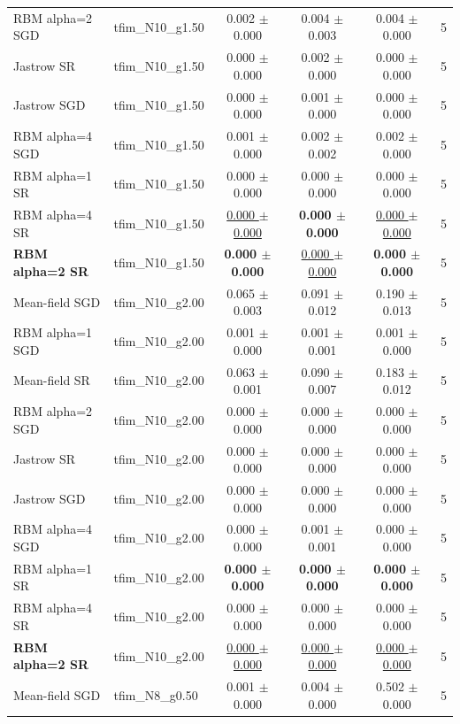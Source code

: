 \begin{tabular}{llcccc}
RBM alpha=2 SGD & tfim\_N10\_g1.50 & 0.002 $\pm$ 0.000 & 0.004 $\pm$ 0.003 & 0.004 $\pm$ 0.000 & 5 \\
Jastrow SR & tfim\_N10\_g1.50 & 0.000 $\pm$ 0.000 & 0.002 $\pm$ 0.000 & 0.000 $\pm$ 0.000 & 5 \\
Jastrow SGD & tfim\_N10\_g1.50 & 0.000 $\pm$ 0.000 & 0.001 $\pm$ 0.000 & 0.000 $\pm$ 0.000 & 5 \\
RBM alpha=4 SGD & tfim\_N10\_g1.50 & 0.001 $\pm$ 0.000 & 0.002 $\pm$ 0.002 & 0.002 $\pm$ 0.000 & 5 \\
RBM alpha=1 SR & tfim\_N10\_g1.50 & 0.000 $\pm$ 0.000 & 0.000 $\pm$ 0.000 & 0.000 $\pm$ 0.000 & 5 \\
RBM alpha=4 SR & tfim\_N10\_g1.50 & \underline{0.000 $\pm$ 0.000} & \textbf{0.000 $\pm$ 0.000} & \underline{0.000 $\pm$ 0.000} & 5 \\
\textbf{RBM alpha=2 SR} & tfim\_N10\_g1.50 & \textbf{0.000 $\pm$ 0.000} & \underline{0.000 $\pm$ 0.000} & \textbf{0.000 $\pm$ 0.000} & 5 \\
\midrule
Mean-field SGD & tfim\_N10\_g2.00 & 0.065 $\pm$ 0.003 & 0.091 $\pm$ 0.012 & 0.190 $\pm$ 0.013 & 5 \\
RBM alpha=1 SGD & tfim\_N10\_g2.00 & 0.001 $\pm$ 0.000 & 0.001 $\pm$ 0.001 & 0.001 $\pm$ 0.000 & 5 \\
Mean-field SR & tfim\_N10\_g2.00 & 0.063 $\pm$ 0.001 & 0.090 $\pm$ 0.007 & 0.183 $\pm$ 0.012 & 5 \\
RBM alpha=2 SGD & tfim\_N10\_g2.00 & 0.000 $\pm$ 0.000 & 0.000 $\pm$ 0.000 & 0.000 $\pm$ 0.000 & 5 \\
Jastrow SR & tfim\_N10\_g2.00 & 0.000 $\pm$ 0.000 & 0.000 $\pm$ 0.000 & 0.000 $\pm$ 0.000 & 5 \\
Jastrow SGD & tfim\_N10\_g2.00 & 0.000 $\pm$ 0.000 & 0.000 $\pm$ 0.000 & 0.000 $\pm$ 0.000 & 5 \\
RBM alpha=4 SGD & tfim\_N10\_g2.00 & 0.000 $\pm$ 0.000 & 0.001 $\pm$ 0.001 & 0.000 $\pm$ 0.000 & 5 \\
RBM alpha=1 SR & tfim\_N10\_g2.00 & \textbf{0.000 $\pm$ 0.000} & \textbf{0.000 $\pm$ 0.000} & \textbf{0.000 $\pm$ 0.000} & 5 \\
RBM alpha=4 SR & tfim\_N10\_g2.00 & 0.000 $\pm$ 0.000 & 0.000 $\pm$ 0.000 & 0.000 $\pm$ 0.000 & 5 \\
\textbf{RBM alpha=2 SR} & tfim\_N10\_g2.00 & \underline{0.000 $\pm$ 0.000} & \underline{0.000 $\pm$ 0.000} & \underline{0.000 $\pm$ 0.000} & 5 \\
\midrule
Mean-field SGD & tfim\_N8\_g0.50 & 0.001 $\pm$ 0.000 & 0.004 $\pm$ 0.000 & 0.502 $\pm$ 0.000 & 5 \\

\end{tabular}
